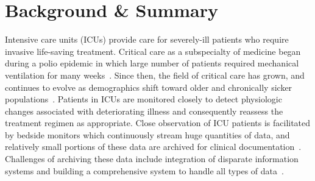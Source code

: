\documentclass[english]{article}
\begin{document}
\section*{Background \& Summary}



Intensive care units (ICUs) provide care for severely-ill patients who require invasive life-saving treatment. Critical care as a subspecialty of medicine began during a polio epidemic in which large number of patients required mechanical ventilation for many weeks~\cite{kelly2014intensive}. Since then, the field of critical care has grown, and continues to evolve as demographics shift toward older and chronically sicker populations~\cite{adhikari2010critical}.
Patients in ICUs are monitored closely to detect physiologic changes associated with deteriorating illness and consequently reassess the treatment regimen as appropriate.
Close observation of ICU patients is facilitated by bedside monitors which continuously stream huge quantities of data, and relatively small portions of these data are archived for clinical documentation~\cite{Celi2013loop}.
Challenges of archiving these data include integration of disparate information systems and building a comprehensive system to handle all types of data~\cite{johnson2016machine}.
\end{document}
